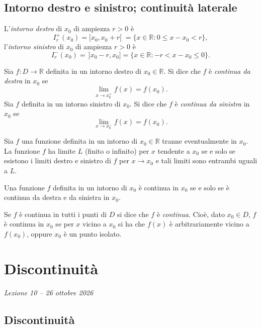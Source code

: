 \documentclass[11pt,a4paper]{article}
\begin{document}
\subsection{Intorno destro e sinistro; continuità laterale}

\begin{definizione}
L'\emph{intorno destro} di $x_0$ di ampiezza $r > 0$ è
\[
I_r^+(x_0) = [x_0, x_0 + r[ \;= \{x \in \mathbb{R} : 0 \le x - x_0 < r\},
\]
l'\emph{intorno sinistro} di $x_0$ di ampiezza $r > 0$ è
\[
I_r^-(x_0) = \,]x_0 - r, x_0] = \{x \in \mathbb{R} : -r < x - x_0 \le 0\}.
\]
\end{definizione}

\begin{definizione}
Sia $f : D \to \mathbb{R}$ definita in un intorno destro di $x_0 \in \mathbb{R}$. Si dice che $f$ è \emph{continua da destra} in $x_0$ se
\[
\lim_{x\to x_0^+} f(x) = f(x_0).
\]
Sia $f$ definita in un intorno sinistro di $x_0$. Si dice che $f$ è \emph{continua da sinistra} in $x_0$ se
\[
\lim_{x\to x_0^-} f(x) = f(x_0).
\]
\end{definizione}

\begin{proposizione}
Sia $f$ una funzione definita in un intorno di $x_0 \in \mathbb{R}$ tranne eventualmente in $x_0$. La funzione $f$ ha limite $L$ (finito o infinito) per $x$ tendente a $x_0$ se e solo se esistono i limiti destro e sinistro di $f$ per $x \to x_0$ e tali limiti sono entrambi uguali a $L$.

Una funzione $f$ definita in un intorno di $x_0$ è continua in $x_0$ se e solo se è continua da destra e da sinistra in $x_0$.
\end{proposizione}

Se $f$ è continua in tutti i punti di $D$ si dice che $f$ è \emph{continua}. Cioè, dato $x_0 \in D$, $f$ è continua in $x_0$ se per $x$ vicino a $x_0$ si ha che $f(x)$ è arbitrariamente vicino a $f(x_0)$, oppure $x_0$ è un punto isolato.

\section[Discontinuità (Lezione 10 -- 26 ottobre 2026)]{Discontinuità}
\noindent\emph{Lezione 10 -- 26 ottobre 2026}
\subsection{Discontinuità}
\end{document}
